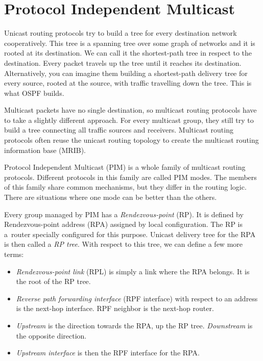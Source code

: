 \chapter{Protocol Independent Multicast}

Unicast routing protocols try to build a tree for every destination network
cooperatively. This tree is a spanning tree over some graph of networks and it
is rooted at its destination. We can call it the shortest-path tree in respect
to the destination. Every packet travels up the tree until it reaches its
destination. Alternatively, you can imagine them building a shortest-path
delivery tree for every source, rooted at the source, with traffic travelling
down the tree. This is what OSPF builds.

Multicast packets have no single destination, so multicast routing protocols
have to take a slightly different approach. For every multicast group, they still
try to build a tree connecting all traffic sources and receivers. Multicast
routing protocols often reuse the unicast routing topology to create the
multicast routing information base (MRIB).

Protocol Independent Multicast (PIM) is a whole family of multicast routing
protocols. Different protocols in this family are called PIM modes. The members of this
family share common mechanisms, but they differ in the routing logic. There are
situations where one mode can be better than the others.

Every group managed by PIM has a \emph{Rendezvous-point} (RP). It is defined by
Rendezvous-point address (RPA) assigned by local configuration. The RP is a~router
specially configured for this purpose. Unicast delivery tree for the RPA is then
called a \emph{RP tree}. With respect to this tree, we can define a few more terms:

\begin{itemize}
\item\emph{Rendezvous-point link} (RPL) is simply a link where the RPA belongs.
  It is the root of the RP tree.
\item\emph{Reverse path forwarding interface} (RPF interface) with respect to
  an address is the next-hop interface. RPF neighbor is the next-hop router.
\item\emph{Upstream} is the direction towards the RPA, up the RP tree.
  \emph{Downstream} is the opposite direction.
\item\emph{Upstream interface} is then the RPF interface for the RPA.
\end{itemize}

